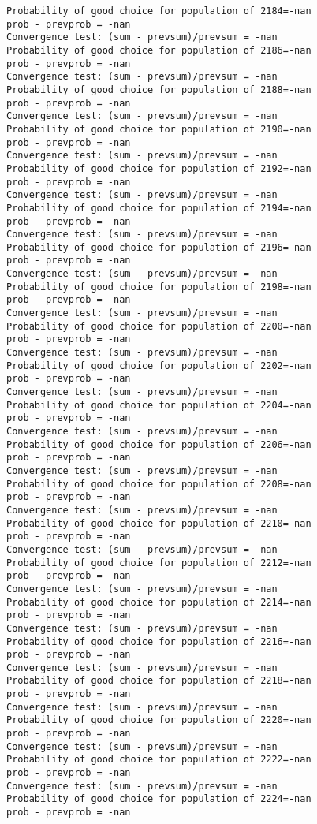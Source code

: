 \documentclass[11pt,onecolumn]{article}
\begin{document}
\begin{verbatim}
Probability of good choice for population of 2184=-nan
prob - prevprob = -nan
Convergence test: (sum - prevsum)/prevsum = -nan
Probability of good choice for population of 2186=-nan
prob - prevprob = -nan
Convergence test: (sum - prevsum)/prevsum = -nan
Probability of good choice for population of 2188=-nan
prob - prevprob = -nan
Convergence test: (sum - prevsum)/prevsum = -nan
Probability of good choice for population of 2190=-nan
prob - prevprob = -nan
Convergence test: (sum - prevsum)/prevsum = -nan
Probability of good choice for population of 2192=-nan
prob - prevprob = -nan
Convergence test: (sum - prevsum)/prevsum = -nan
Probability of good choice for population of 2194=-nan
prob - prevprob = -nan
Convergence test: (sum - prevsum)/prevsum = -nan
Probability of good choice for population of 2196=-nan
prob - prevprob = -nan
Convergence test: (sum - prevsum)/prevsum = -nan
Probability of good choice for population of 2198=-nan
prob - prevprob = -nan
Convergence test: (sum - prevsum)/prevsum = -nan
Probability of good choice for population of 2200=-nan
prob - prevprob = -nan
Convergence test: (sum - prevsum)/prevsum = -nan
Probability of good choice for population of 2202=-nan
prob - prevprob = -nan
Convergence test: (sum - prevsum)/prevsum = -nan
Probability of good choice for population of 2204=-nan
prob - prevprob = -nan
Convergence test: (sum - prevsum)/prevsum = -nan
Probability of good choice for population of 2206=-nan
prob - prevprob = -nan
Convergence test: (sum - prevsum)/prevsum = -nan
Probability of good choice for population of 2208=-nan
prob - prevprob = -nan
Convergence test: (sum - prevsum)/prevsum = -nan
Probability of good choice for population of 2210=-nan
prob - prevprob = -nan
Convergence test: (sum - prevsum)/prevsum = -nan
Probability of good choice for population of 2212=-nan
prob - prevprob = -nan
Convergence test: (sum - prevsum)/prevsum = -nan
Probability of good choice for population of 2214=-nan
prob - prevprob = -nan
Convergence test: (sum - prevsum)/prevsum = -nan
Probability of good choice for population of 2216=-nan
prob - prevprob = -nan
Convergence test: (sum - prevsum)/prevsum = -nan
Probability of good choice for population of 2218=-nan
prob - prevprob = -nan
Convergence test: (sum - prevsum)/prevsum = -nan
Probability of good choice for population of 2220=-nan
prob - prevprob = -nan
Convergence test: (sum - prevsum)/prevsum = -nan
Probability of good choice for population of 2222=-nan
prob - prevprob = -nan
Convergence test: (sum - prevsum)/prevsum = -nan
Probability of good choice for population of 2224=-nan
prob - prevprob = -nan

\end{verbatim}
\end{document}
